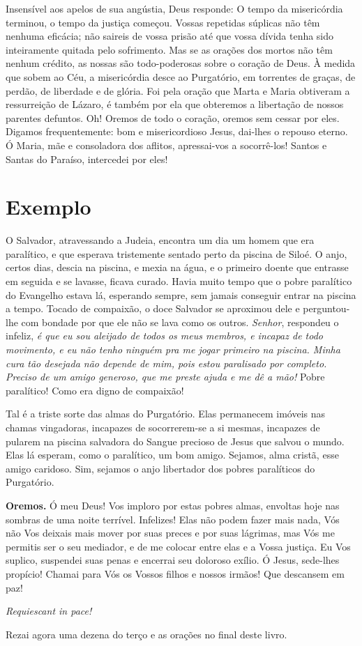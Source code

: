 Insensível aos apelos de sua angústia, Deus responde: O tempo da misericórdia terminou, o tempo da justiça começou. Vossas repetidas súplicas não têm nenhuma eficácia; não saireis de vossa prisão até que vossa dívida tenha sido inteiramente quitada pelo sofrimento. Mas se as orações dos mortos não têm nenhum crédito, as nossas são todo-poderosas sobre o coração de Deus. À medida que sobem ao Céu, a misericórdia desce ao Purgatório, em torrentes de graças, de perdão, de liberdade e de glória. Foi pela oração que Marta e Maria obtiveram a ressurreição de Lázaro, é também por ela que obteremos a libertação de nossos parentes defuntos. Oh! Oremos de todo o coração, oremos sem cessar por eles. Digamos frequentemente: bom e misericordioso Jesus, dai-lhes o repouso eterno. Ó Maria, mãe e consoladora dos aflitos, apressai-vos a socorrê-los! Santos e Santas do Paraíso, intercedei por eles!


\section*{Exemplo}

O Salvador, atravessando a Judeia, encontra um dia um homem que era paralítico, e que esperava tristemente sentado perto da piscina de Siloé. O anjo, certos dias, descia na piscina, e mexia na água, e o primeiro doente que entrasse em seguida e se lavasse, ficava curado. Havia muito tempo que o pobre paralítico do Evangelho estava lá, esperando sempre, sem jamais conseguir entrar na piscina a tempo. Tocado de compaixão, o doce Salvador se aproximou dele e perguntou-lhe com bondade por que ele não se lava como os outros. \textit{Senhor}, respondeu o infeliz, \textit{é que eu sou aleijado de todos os meus membros, e incapaz de todo movimento, e eu não tenho ninguém pra me jogar primeiro na piscina. Minha cura tão desejada não depende de mim, pois estou paralisado por completo. Preciso de um amigo generoso, que me preste ajuda e me dê a mão!} Pobre paralítico! Como era digno de compaixão!

Tal é a triste sorte das almas do Purgatório. Elas permanecem imóveis nas chamas vingadoras, incapazes de socorrerem-se a si mesmas, incapazes de pularem na piscina salvadora do Sangue precioso de Jesus que salvou o mundo. Elas lá esperam, como o paralítico, um bom amigo. Sejamos, alma cristã, esse amigo caridoso. Sim, sejamos o anjo libertador dos pobres paralíticos do Purgatório.


\vspace{\baselineskip}\noindent \textbf{Oremos.} Ó meu Deus! Vos imploro por estas pobres almas, envoltas hoje nas sombras de uma noite terrível. Infelizes! Elas não podem fazer mais nada, Vós não Vos deixais mais mover por suas preces e por suas lágrimas, mas Vós me permitis ser o seu mediador, e de me colocar entre elas e a Vossa justiça. Eu Vos suplico, suspendei suas penas e encerrai seu doloroso exílio. Ó Jesus, sede-lhes propício! Chamai para Vós os Vossos filhos e nossos irmãos! Que descansem em paz!



\begin{center}
\textit{Requiescant in pace!}
\end{center}

Rezai agora uma dezena do terço e as orações no final deste livro.
